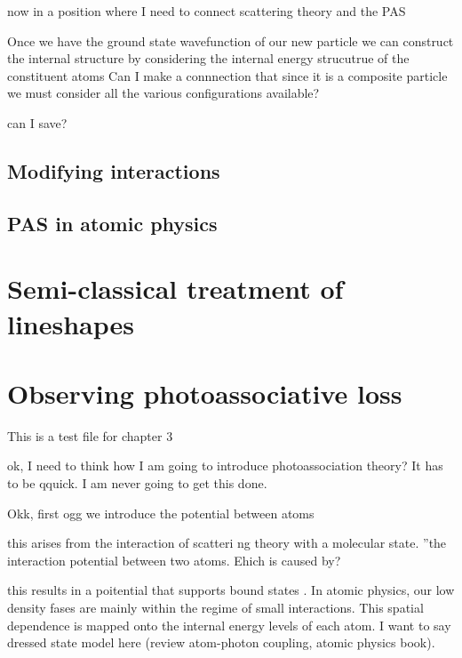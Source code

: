 now in a position where I need to connect scattering theory and the PAS


Once we have the ground state wavefunction of our new particle we can construct the internal structure by considering the internal energy strucutrue of the constituent atoms
	Can I make a connnection that since it is a composite particle we must consider all the various configurations available?
	
can I save?

\subsection{Modifying interactions}
\label{ssec:mod_int}

\subsection{PAS in atomic physics}
\label{ssec:pas_amo}

\section{Semi-classical treatment of lineshapes}
\label{sec:bohn_and_julienne}

\section{Observing photoassociative loss}
\label{sec:pa_methods}

This is a test file for chapter 3

ok, I need to think how I am going to introduce photoassociation theory? It has to be qquick. I am never going to get this done. 

Okk, first ogg we introduce the potential between atoms

this arises from the interaction of scatteri ng theory with a molecular state. ''the interaction potential between two atoms. Ehich is caused by?

this results in a poitential that supports bound states . In atomic physics, our low density fases are mainly within the regime of small interactions. This spatial dependence is mapped onto the internal energy levels of each atom. I want to say dressed state model here (review atom-photon coupling, atomic physics book).  